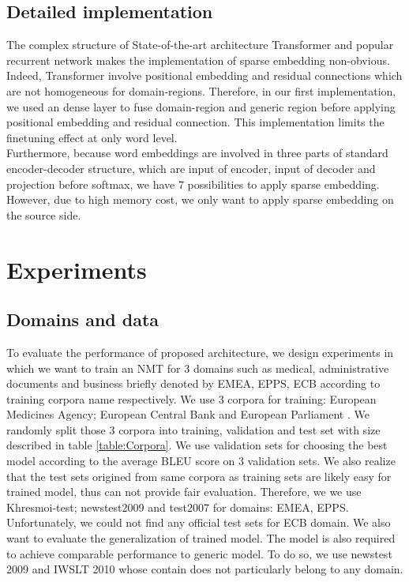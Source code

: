 \documentclass[11pt,a4paper]{article}
\newcommand{\fyTodo}[1]{\Todo[FY>]{\textcolor{orange}{#1}}}
\begin{document}
\subsection{Detailed implementation}
The complex structure of State-of-the-art architecture Transformer \cite{NIPS2017_7181} and popular recurrent network \cite{bahdanau2014neural} makes the implementation of sparse embedding non-obvious. Indeed, Transformer involve positional embedding and residual connections which are not homogeneous for domain-regions. Therefore, in our first implementation, we used an dense layer to fuse domain-region and generic region before applying positional embedding and residual connection. This implementation limits the finetuning effect at only word level.\\
Furthermore, because word embeddings are involved in three parts of standard encoder-decoder structure, which are input of encoder, input of decoder and projection before softmax, we have 7 possibilities to apply sparse embedding. However, due to high memory cost, we only want to apply sparse embedding on the source side. \fyTodo{Explain this. Future work ?}

\section{Experiments}
\subsection{Domains and data \label{subsec:data}}
To evaluate the performance of proposed architecture, we design experiments in which we want to train an NMT for 3 domains such as medical, administrative documents and business briefly denoted by EMEA, EPPS, ECB according to training corpora name respectively. We use 3 corpora for training: European Medicines Agency; European Central Bank and European Parliament \cite{Tiedemann2009RANLP5}. We randomly split those 3 corpora into training, validation and test set with size described in table \ref{table:Corpora}. We use validation sets for choosing the best model according to the average BLEU score on 3 validation sets. We also realize that the test sets origined from same corpora as training sets are likely easy for trained model, thus can not provide fair evaluation. Therefore, we we use Khresmoi-test; newstest2009 and test2007 for domains: EMEA, EPPS. Unfortunately, we could not find any official test sets for ECB domain. We also want to evaluate the generalization of trained model. The model is also required to achieve comparable performance to generic model. To do so, we use newstest 2009 and IWSLT 2010 whose contain does not particularly belong to any domain.\fyTodo{Clarify / simplify text}
\end{document}
